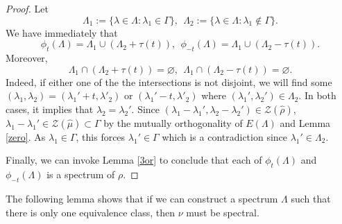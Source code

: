 \documentclass[reqno,a4paper,12pt]{amsart}
\numberwithin{equation}{section}
\theoremstyle{remark}
\numberwithin{equation}{section}
\begin{document}
\begin{proof}
Let
\[
\Lambda_{1}:=\{\lambda\in \Lambda:\lambda_{1}\in \Gamma\},\ \ \Lambda_{2}:=\{\lambda\in \Lambda:\lambda_{1}\notin \Gamma\}.
\]
We have immediately that 
$$
\phi_{t}(\Lambda)=\Lambda_{1}\cup(\Lambda_{2}+\tau(t)), \ \ \phi_{-t}(\Lambda)=\Lambda_{1}\cup(\Lambda_{2}-\tau(t)).$$
Moreover,
$$\Lambda_{1}\cap(\Lambda_{2}+\tau(t))=\varnothing, \ \ \Lambda_{1}\cap (\Lambda_{2}-\tau(t))=\varnothing.$$
Indeed, if either one of the the intersections is not disjoint, we will find some $(\lambda_1,\lambda_2) = (\lambda_1'+t,\lambda'_2)$ or $(\lambda_1'-t,\lambda'_2)$ where $(\lambda_1',\lambda_2')\in\Lambda_2$. In both cases, it implies that $\lambda_2 = \lambda_2'$. Since $(\lambda_1-\lambda_1',\lambda_2-\lambda_2')\in{\mathcal Z}(\widehat{\rho})$,   $\lambda_1-\lambda_1'\in{\mathcal Z}(\widehat{\mu})\subset \Gamma$ by the mutually orthogonality of $E(\Lambda)$ and Lemma \ref{zero}. As $\lambda_1\in\Gamma$, this forces $\lambda_1'\in\Gamma$ which is a contradiction since $\lambda_1'\in\Lambda_2$.

Finally, we can invoke  Lemma \ref{3or} to conclude that {each of} $\phi_{t}(\Lambda)$ and $\phi_{-t}(\Lambda)$ is a spectrum of $\rho$.
\end{proof}



The following lemma shows that if we can construct a spectrum $\Lambda$ such that there is only one equivalence class, then $\nu$ must be spectral. 
\end{document}
